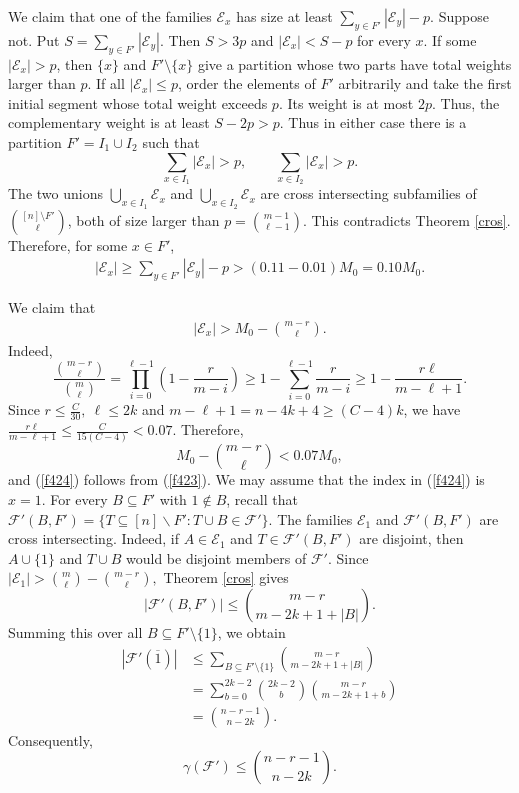 \documentclass[11pt]{article}
\numberwithin{equation}{section}
\begin{document}
We claim that one of the families $\mathcal{E}_x$ has size at least $\sum_{y\in F'}|\mathcal{E}_y|-p$. Suppose not. Put $S=\sum_{y\in F'}|\mathcal{E}_y|$. Then $S>3p$ and $|\mathcal{E}_x|<S-p$ for every $x$. If some $|\mathcal{E}_x|>p$, then $\{x\}$ and $F'\setminus\{x\}$ give a partition whose two parts have total weights larger than $p$. If all $|\mathcal{E}_x|\leq p$, order the elements of $F'$ arbitrarily and take the first initial segment whose total weight exceeds $p$. Its weight is at most $2p$. Thus, the complementary weight is at least $S-2p>p$. Thus in either case there is a partition $F'=I_1\cup I_2$ such that
$$
\sum_{x\in I_1}|\mathcal{E}_x|>p,\qquad \sum_{x\in I_2}|\mathcal{E}_x|>p.
$$
The two unions $\bigcup_{x\in I_1}\mathcal{E}_x$ and $\bigcup_{x\in I_2}\mathcal{E}_x$ are cross intersecting subfamilies of \(\binom{[n]\setminus F'}{\ell}\), both of size larger than $p=\binom{m-1}{\ell-1}$. This contradicts Theorem \ref{cros}. Therefore, for some $x\in F'$,
\begin{align}
|\mathcal{E}_x| \ge \sum_{y\in F'}|\mathcal{E}_y| - p > (0.11 - 0.01)M_0 = 0.10M_0. \label{f423}
\end{align}

We claim that
\begin{align}
|\mathcal{E}_x| > M_0 - \binom{m-r}{\ell}. \label{f424}
\end{align}
Indeed,
$$
\frac{\binom{m-r}{\ell}}{\binom{m}{\ell}}
= \prod_{i=0}^{\ell-1} \left(1 - \frac{r}{m-i}\right)
\geq 1 - \sum_{i=0}^{\ell-1} \frac{r}{m-i}
\geq 1 - \frac{r\ell}{m-\ell+1}.
$$
Since
$
r \leq \frac{C}{30},\ \ell \leq 2k$ and $ m-\ell+1 = n-4k+4 \geq (C-4)k$,
we have
$
\frac{r\ell}{m-\ell+1} \leq \frac{C}{15(C-4)} < 0.07.
$
Therefore,
$$
M_0 - \binom{m-r}{\ell} < 0.07M_0,
$$
and (\ref{f424}) follows from (\ref{f423}).
We may assume that the index in (\ref{f424}) is $x=1$.  For every $B\subseteq F'$ with $1\notin B$, recall that
$
\mathcal{F}'(B,F')=\{T\subseteq [n]\backslash F': T\cup B\in \mathcal{F}'\}.
$
The families $\mathcal{E}_1$ and $\mathcal{F}'(B,F')$ are cross intersecting. Indeed, if $A\in \mathcal{E}_1$ and $T\in \mathcal{F}'(B,F')$ are disjoint, then $A\cup\{1\}$ and $T\cup B$ would be disjoint members of $\mathcal{F}'$. Since
$
|\mathcal{E}_1| > \binom{m}{\ell} - \binom{m-r}{\ell},
$
Theorem \ref{cros} gives
$$
|\mathcal{F}'(B,F')| \leq \binom{m-r}{m-2k+1+|B|}. 
$$
Summing this over all $B\subseteq F'\setminus\{1\}$, we obtain
$$
\begin{aligned}
|\mathcal{F}'(\overline{1})|
&\leq \sum_{B\subseteq F'\setminus\{1\}} \binom{m-r}{m-2k+1+|B|} \\
&= \sum_{b=0}^{2k-2} \binom{2k-2}{b} \binom{m-r}{m-2k+1+b} \\
&= \binom{n-r-1}{n-2k}.
\end{aligned}
$$
Consequently,
$$
\gamma(\mathcal{F}') \leq \binom{n-r-1}{n-2k}.
$$
\end{document}
